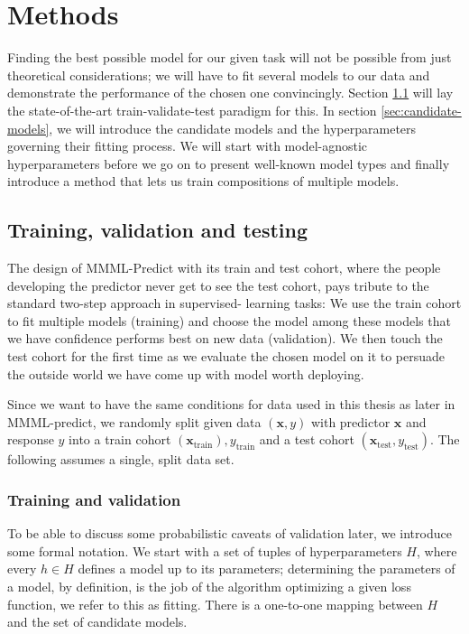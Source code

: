 \chapter{Methods} \label{chap:methods}

Finding the best possible model for our given task will not be possible from just theoretical 
considerations; we will have to fit several models to our data and demonstrate the performance of 
the chosen one convincingly. Section \ref{sec:train-val-test} will lay the state-of-the-art 
train-validate-test paradigm for this. In section \ref{sec:candidate-models}, we will introduce 
the candidate models and the hyperparameters governing their fitting process. We will start with 
model-agnostic hyperparameters before we go on to present well-known model types and finally 
introduce a method that lets us train compositions of multiple models.

\section{Training, validation and testing}\label{sec:train-val-test}

The design of MMML-Predict with its train and test cohort, where the people developing the predictor 
never get to see the test cohort, pays tribute to the standard two-step approach in supervised-
learning tasks: We use the train cohort to fit multiple models (training) and choose the model
among these models that we have confidence performs best on new data (validation). We then touch 
the test cohort for the first time as we evaluate the chosen model on it to persuade the outside 
world we have come up with model worth deploying.

Since we want to have the same conditions for data used in this thesis as later in MMML-predict,
we randomly split given data $(\mathbf{x}, y)$ with predictor $\mathbf{x}$ and response $y$ into 
a train cohort $(\mathbf{x}_\text{train}), y_\text{train}$ and a test cohort $(\mathbf{x}_\text{test}, y_\text{test})$.
The following assumes a single, split data set.

\subsection{Training and validation}\label{subsec:train-val}

To be able to discuss some probabilistic caveats of validation later, we introduce some formal 
notation. We start with a set of tuples of hyperparameters $H$, where every $h \in H$ defines a model
up to its parameters; determining the parameters of a model, by definition, is the job of the 
algorithm optimizing a given loss function, we refer to this as fitting. There is a one-to-one 
mapping between $H$ and the set of candidate models.

